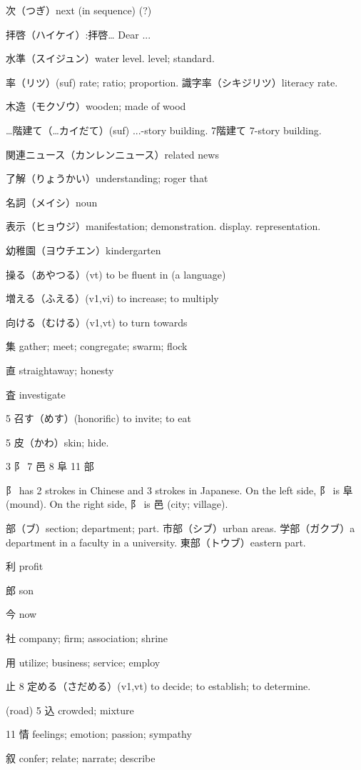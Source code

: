 次（つぎ）next (in sequence) (?)

拝啓（ハイケイ）:拝啓… Dear ...

水準（スイジュン）water level. level; standard.

率（リツ）(suf) rate; ratio; proportion.
識字率（シキジリツ）literacy rate.

木造（モクゾウ）wooden; made of wood

…階建て（…カイだて）(suf) ...-story building.
7階建て 7-story building.

関連ニュース（カンレンニュース）related news

了解（りょうかい）understanding; roger that

名詞（メイシ）noun

表示（ヒョウジ）manifestation; demonstration. display. representation.

幼稚園（ヨウチエン）kindergarten

操る（あやつる）(vt) to be fluent in (a language)

増える（ふえる）(v1,vi) to increase; to multiply

向ける（むける）(v1,vt) to turn towards

集 gather; meet; congregate; swarm; flock

直 straightaway; honesty

査 investigate

5 召す（めす）(honorific) to invite; to eat

5 皮（かわ）skin; hide.

3 阝 7 邑 8 阜 11 部

阝 has 2 strokes in Chinese and 3 strokes in Japanese.
On the left side, 阝 is 阜 (mound).
On the right side, 阝 is 邑 (city; village).

部（ブ）section; department; part.
市部（シブ）urban areas.
学部（ガクブ）a department in a faculty in a university.
東部（トウブ）eastern part.

利 profit

郎 son

今 now

社 company; firm; association; shrine

用 utilize; business; service; employ

止 8 定める（さだめる）(v1,vt) to decide; to establish; to determine.

(road) 5 込 crowded; mixture

11 情 feelings; emotion; passion; sympathy

叙 confer; relate; narrate; describe


